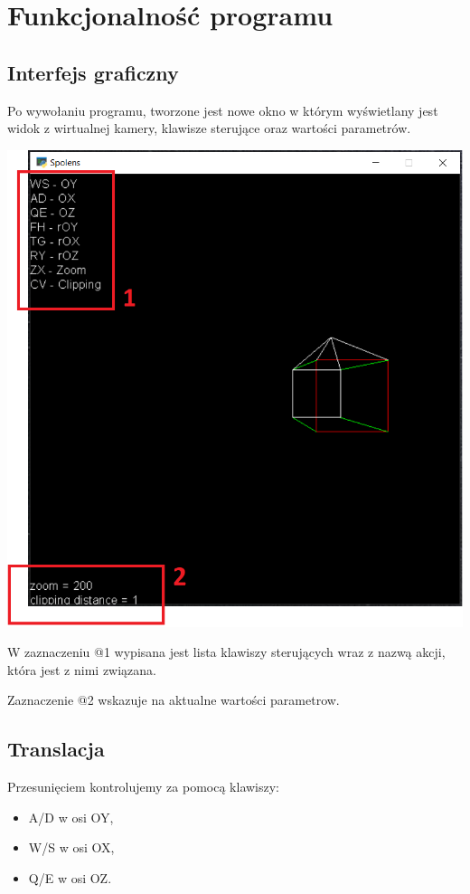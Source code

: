 \documentclass[12pt]{article}
\begin{document}
\section{Funkcjonalność programu}

\subsection{Interfejs graficzny}
Po wywołaniu programu, tworzone jest nowe okno w którym wyświetlany jest widok z wirtualnej kamery, klawisze sterujące oraz wartości parametrów.

\begin{center}
    \noindent\includegraphics[scale=0.5]{spolens ui.png}
\end{center}

W zaznaczeniu @1 wypisana jest lista klawiszy sterujących wraz z nazwą akcji, która jest z nimi związana.

Zaznaczenie @2 wskazuje na aktualne wartości parametrow.

\newpage
\subsection{Translacja}
Przesunięciem kontrolujemy za pomocą klawiszy:
\begin{itemize}
    \item A/D w osi OY,
    \item W/S w osi OX,
    \item Q/E w osi OZ.
\end{itemize}
\end{document}

